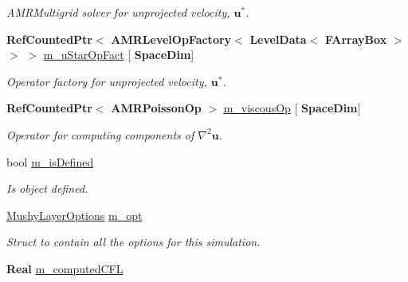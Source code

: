 \begin{DoxyCompactItemize}
\begin{DoxyCompactList}\small\item\em A\+M\+R\+Multigrid solver for unprojected velocity, $ \mathbf{u}^* $. \end{DoxyCompactList}\item 
\mbox{\label{class_a_m_r_level_mushy_layer_a3450c57623aeb32049ce4a8928597209}} 
\textbf{ Ref\+Counted\+Ptr}$<$ \textbf{ A\+M\+R\+Level\+Op\+Factory}$<$ \textbf{ Level\+Data}$<$ \textbf{ F\+Array\+Box} $>$ $>$ $>$ \hyperlink{class_a_m_r_level_mushy_layer_a3450c57623aeb32049ce4a8928597209}{m\+\_\+u\+Star\+Op\+Fact} \mbox{[}\textbf{ Space\+Dim}\mbox{]}
\begin{DoxyCompactList}\small\item\em Operator factory for unprojected velocity, $ \mathbf{u}^* $. \end{DoxyCompactList}\item 
\mbox{\label{class_a_m_r_level_mushy_layer_a4d91e3fa25799fc66e74808c545892b6}} 
\textbf{ Ref\+Counted\+Ptr}$<$ \textbf{ A\+M\+R\+Poisson\+Op} $>$ \hyperlink{class_a_m_r_level_mushy_layer_a4d91e3fa25799fc66e74808c545892b6}{m\+\_\+viscous\+Op} \mbox{[}\textbf{ Space\+Dim}\mbox{]}
\begin{DoxyCompactList}\small\item\em Operator for computing components of $ \nabla^2 \mathbf{u} $. \end{DoxyCompactList}\item 
\mbox{\label{class_a_m_r_level_mushy_layer_a6b8c2c0a55b677d826818cf7f26128aa}} 
bool \hyperlink{class_a_m_r_level_mushy_layer_a6b8c2c0a55b677d826818cf7f26128aa}{m\+\_\+is\+Defined}
\begin{DoxyCompactList}\small\item\em Is object defined. \end{DoxyCompactList}\item 
\hyperlink{struct_mushy_layer_options}{Mushy\+Layer\+Options} \hyperlink{class_a_m_r_level_mushy_layer_a3652e6785ac8c5e429a5ac286ea3bc2e}{m\+\_\+opt}
\begin{DoxyCompactList}\small\item\em Struct to contain all the options for this simulation. \end{DoxyCompactList}\item 
\textbf{ Real} \hyperlink{class_a_m_r_level_mushy_layer_aa7a6e8a5cb2cb6f690c047e46d70547f}{m\+\_\+computed\+C\+FL}

\end{DoxyCompactItemize}
